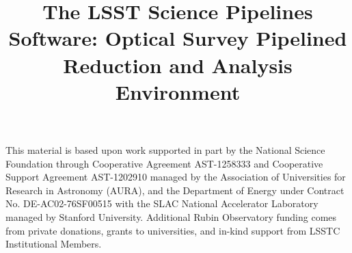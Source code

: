 \documentclass[twocolumn]{aastex631}
\begin{document}
\title{The LSST Science Pipelines Software: Optical Survey Pipelined Reduction and Analysis Environment}























\begin{acknowledgments}
This material is based upon work supported in part by the National Science Foundation through Cooperative Agreement AST-1258333 and Cooperative Support Agreement AST-1202910 managed by the Association of Universities for Research in Astronomy (AURA), and the Department of Energy under Contract No. DE-AC02-76SF00515 with the SLAC National Accelerator Laboratory managed by Stanford University.
Additional Rubin Observatory funding comes from private donations, grants to universities, and in-kind support from LSSTC Institutional Members.
\end{acknowledgments}



\end{document}
